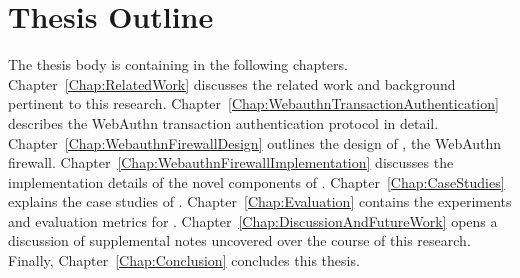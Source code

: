 
\section{Thesis Outline}

The thesis body is containing in the following chapters. Chapter~\ref{Chap:RelatedWork} discusses the related work and background pertinent to this research. Chapter~\ref{Chap:WebauthnTransactionAuthentication} describes the WebAuthn transaction authentication protocol in detail. Chapter~\ref{Chap:WebauthnFirewallDesign} outlines the design of \sys{}, the WebAuthn firewall. Chapter~\ref{Chap:WebauthnFirewallImplementation} discusses the implementation details of the novel components of \sys{}. Chapter~\ref{Chap:CaseStudies} explains the case studies of \sys{}. Chapter~\ref{Chap:Evaluation} contains the experiments and evaluation metrics for \sys{}. Chapter~\ref{Chap:DiscussionAndFutureWork} opens a discussion of supplemental notes uncovered over the course of this research. Finally, Chapter~\ref{Chap:Conclusion} concludes this thesis.
